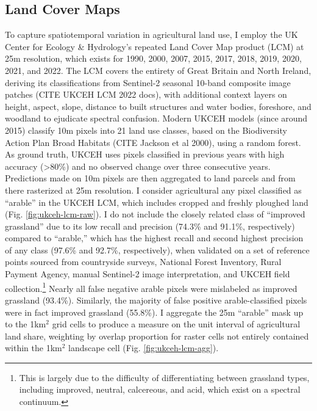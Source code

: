 \subsection{Land Cover Maps}
To capture spatiotemporal variation in agricultural land use, I employ the UK Center for Ecology \& Hydrology's repeated Land Cover Map product (LCM) at 25m resolution, which exists for 1990, 2000, 2007, 2015, 2017, 2018, 2019, 2020, 2021, and 2022. The LCM covers the entirety of Great Britain and North Ireland, deriving its classifications from Sentinel-2 seasonal 10-band composite image patches (CITE UKCEH LCM 2022 docs), with additional context layers on height, aspect, slope, distance to built structures and water bodies, foreshore, and woodland to ejudicate spectral confusion. Modern UKCEH models (since around 2015) classify 10m pixels into 21 land use classes, based on the Biodiversity Action Plan Broad Habitats (CITE Jackson et al 2000), using a random forest. As ground truth, UKCEH uses pixels classified in previous years with high accuracy (>80\%) and no observed change over three consecutive years. Predictions made on 10m pixels are then aggregated to land parcels and from there rasterized at 25m resolution. I consider agricultural any pixel classified as ``arable'' in the UKCEH LCM, which includes cropped and freshly ploughed land (Fig. \ref{fig:ukceh-lcm-raw}). I do not include the closely related class of ``improved grassland'' due to its low recall and precision (74.3\% and 91.1\%, respectively) compared to ``arable,'' which has the highest recall and second highest precision of any class (97.6\% and 92.7\%, respectively), when validated on a set of reference points sourced from countryside surveys, National Forest Inventory, Rural Payment Agency, manual Sentinel-2 image interpretation, and UKCEH field collection.\footnote{This is largely due to the difficulty of differentiating between grassland types, including improved, neutral, calcereous, and acid, which exist on a spectral continuum.} Nearly all false negative arable pixels were mislabeled as improved grassland (93.4\%). Similarly, the majority of false positive arable-classified pixels were in fact improved grassland (55.8\%). I aggregate the 25m ``arable'' mask up to the 1km$^2$ grid cells to produce a measure on the unit interval of agricultural land share, weighting by overlap proportion for raster cells not entirely contained within the 1km$^2$ landscape cell (Fig. \ref{fig:ukceh-lcm-agg}). 


